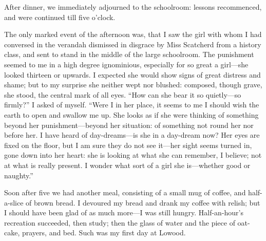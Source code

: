 After dinner, we immediately adjourned to the schoolroom: lessons
recommenced, and were continued till five o'clock.

The only marked event of the afternoon was, that I saw the girl with
whom I had conversed in the verandah dismissed in disgrace by Miss
Scatcherd from a history class, and sent to stand in the middle of the
large schoolroom. The punishment seemed to me in a high degree
ignominious, especially for so great a girl---she looked thirteen or
upwards. I expected she would show signs of great distress and shame;
but to my surprise she neither wept nor blushed: composed, though grave,
she stood, the central mark of all eyes. \enquote{How can she bear it
	so quietly---so firmly?} I asked of myself. \enquote{Were I in her
	place, it seems to me I should wish the earth to open and swallow me
	up. She looks as if she were thinking of something beyond her
	punishment---beyond her situation: of something not round her nor before
	her. I have heard of day-dreams---is she in a day-dream now? Her eyes
	are fixed on the floor, but I am sure they do not see it---her sight
	seems turned in, gone down into her heart: she is looking at what she
	can remember, I believe; not at what is really present. I wonder what
	sort of a girl she is---whether good or naughty.}

Soon after five \PM{} we had another meal, consisting of a small mug of
coffee, and half-a-slice of brown bread. I devoured my bread and drank
my coffee with relish; but I should have been glad of as much more---I
was still hungry. Half-an-hour's recreation succeeded, then study; then
the glass of water and the piece of oat-cake, prayers, and bed. Such
was my first day at Lowood.
